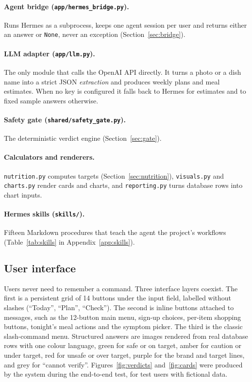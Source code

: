 \documentclass[11pt,a4paper]{article}
\begin{document}
\paragraph{Agent bridge (\texttt{app/hermes\_bridge.py}).} Runs Hermes as a subprocess, keeps one agent
session per user and returns either an answer or \texttt{None}, never an exception
(Section~\ref{sec:bridge}).

\paragraph{LLM adapter (\texttt{app/llm.py}).} The only module that calls the OpenAI API directly. It
turns a photo or a dish name into a strict JSON \emph{extraction} and produces weekly plans and meal
estimates. When no key is configured it falls back to Hermes for estimates and to fixed sample answers
otherwise.

\paragraph{Safety gate (\texttt{shared/safety\_gate.py}).} The deterministic verdict engine
(Section~\ref{sec:gate}).

\paragraph{Calculators and renderers.} \texttt{nutrition.py} computes targets
(Section~\ref{sec:nutrition}), \texttt{visuals.py} and \texttt{charts.py} render cards and charts, and
\texttt{reporting.py} turns database rows into chart inputs.

\paragraph{Hermes skills (\texttt{skills/}).} Fifteen Markdown procedures that teach the agent the
project's workflows (Table~\ref{tab:skills} in Appendix~\ref{app:skills}).

\subsection{User interface}

Users never need to remember a command. Three interface layers coexist. The first is a persistent grid
of 14 buttons under the input field, labelled without slashes (``Today'', ``Plan'', ``Check''). The
second is inline buttons attached to messages, such as the 12-button main menu, sign-up choices,
per-item shopping buttons, tonight's meal actions and the symptom picker. The third is the classic
slash-command menu. Structured answers are images rendered from real database rows with one colour
language, green for safe or on target, amber for caution or under target, red for unsafe or over
target, purple for the brand and target lines, and grey for ``cannot verify''.
Figures~\ref{fig:verdicts} and~\ref{fig:cards} were produced by the system during the end-to-end test,
for test users with fictional data.
\end{document}
